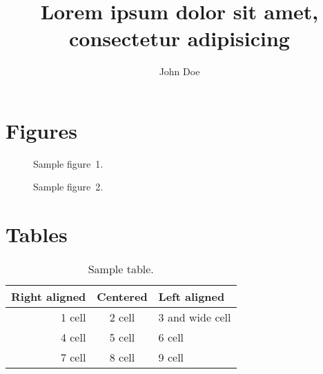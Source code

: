 \documentclass[slanted]{acmeyatcl} %
\begin{document}
\title{Lorem ipsum dolor sit amet, consectetur adipisicing}
\author{John Doe}



\maketitle

\nocite{lorem, ipsum}


\begin{abstract}
  \blindtext
\end{abstract}


\begin{twocols}

\blindmathtrue
\Blinddocument

\end{twocols}


\section*{Figures}

\begin{twocols}

  \begin{figure}[H]
    \centering
    \caption{Sample figure~1.}
  \end{figure}

  \begin{figure}[H]
    \centering
    \caption{Sample figure~2.}
  \end{figure}

\end{twocols}


\section*{Tables}

\begin{table}[H]
  \centering
  \begin{tabular}{rcl}
    \toprule
      \bfseries Right aligned &
      \bfseries Centered &
      \bfseries Left aligned \\
    \midrule
      1\up{st} cell & 2\up{nd} cell & 3\up{rd} and wide cell \\
      4\up{th} cell & 5\up{th} cell & 6\up{th} cell \\
      7\up{th} cell & 8\up{th} cell & 9\up{th} cell \\
    \bottomrule
  \end{tabular}
  \caption{Sample table.}
\end{table}



\end{document}
